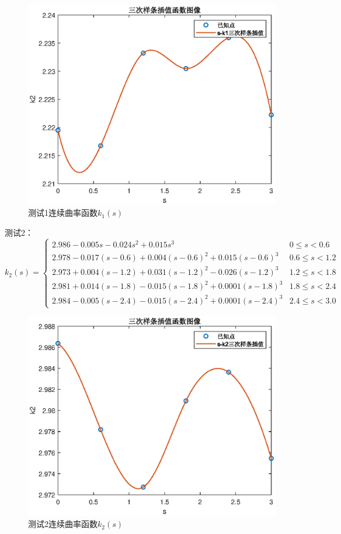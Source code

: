 \documentclass[withoutpreface,bwprint]{cumcmthesis}
\begin{document}
\begin{figure}[!h]
\centering
\includegraphics[width=.9\textwidth]{s-k1.eps}
\caption{测试1连续曲率函数$k_1(s)$}
\end{figure}

测试2：
\begin{equation}
k_2(s) =
\begin{cases}
2.986 - 0.005s -0.024s^2 + 0.015s^3 & 0 \leqslant s < 0.6 \\
2.978 - 0.017(s - 0.6) + 0.004(s - 0.6)^2 + 0.015(s - 0.6)^3 & 0.6 \leqslant s < 1.2 \\
2.973 + 0.004(s - 1.2) + 0.031(s - 1.2)^2 - 0.026(s - 1.2)^3 & 1.2 \leqslant s < 1.8 \\
2.981 + 0.014(s - 1.8) - 0.015(s - 1.8)^2 + 0.0001(s - 1.8)^3 & 1.8 \leqslant s < 2.4 \\
2.984 - 0.005(s - 2.4) - 0.015(s - 2.4)^2 + 0.0001(s - 2.4)^3 & 2.4 \leqslant s < 3.0
\end{cases}
\end{equation}

\begin{figure}[!h]
\centering
\includegraphics[width=.9\textwidth]{s-k2.eps}
\caption{测试2连续曲率函数$k_2(s)$}
\end{figure}
\end{document}
